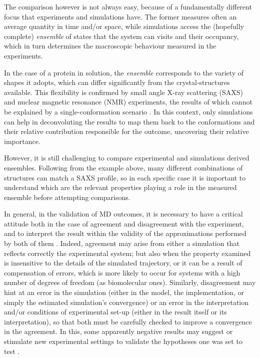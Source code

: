 The comparison however is not always easy, because of a fundamentally different focus that experiments and simulations have. The former measures often an average quantity in time and/or space, while simulations access the (hopefully complete) \emph{ensemble} of states that the system can visits and their occupancy, which in turn determines the macroscopic behaviour measured in the experiments.

In the case of a protein in solution, the \emph{ensemble} corresponds to the variety of shapes it adopts, which can differ significantly from the crystal-structures available. This flexibility is confirmed by small angle X-ray scattering (SAXS) and nuclear magnetic resonance (NMR) experiments, the results of which cannot be explained by a single-conformation scenario \citep{Bonomi2017,Kikhney2015,Kleckner2011}. In this context, only simulations can help in deconvoluting the results to map them back to the conformations and their relative contribution responsible for the outcome, uncovering their relative importance.

However, it is still challenging to compare experimental and simulations derived ensembles. Following from the example above, many different combinations of structures can match a SAXS profile, so in each specific case it is important to understand which are the relevant properties playing a role in the measured ensemble before attempting comparisons.

In general, in the validation of MD outcomes, it is necessary to have a critical attitude both in the case of agreement and disagreement with the experiment, and to interpret the result within the validity of the approximations performed by both of them \citep{VanGunsteren2008}.
%
Indeed, agreement may arise from either a simulation that reflects correctly the experimental system; but also when the property examined is insensitive to the details of the simulated trajectory, or it can be a result of compensation of errors, which is more likely to occur for systems with a high number of degrees of freedom (as biomolecular ones).
%
Similarly, disagreement may hint at an error in the simulation (either in the model, the implementation, or simply the estimated simulation's convergence) or an error in the interpretation and/or conditions of experimental set-up (either in the result itself or its interpretation), so that both must be carefully checked to improve a convergence in the agreement.
%
In this, some apparently negative results may suggest or stimulate new experimental settings to validate the hypotheses one was set to test \citep{Goncalves2013,Meissner2014}.

